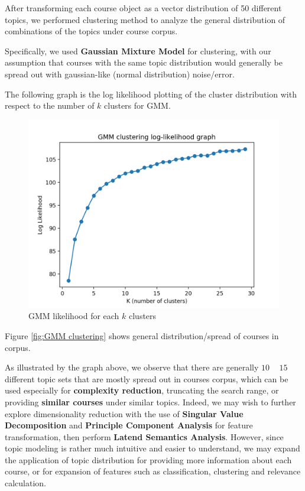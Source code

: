 \documentclass[twoside]{article}
\begin{document}
After transforming each course object as a vector distribution of 50 different topics, we performed clustering method to analyze the general distribution of combinations of the topics under course corpus.

Specifically, we used \textbf{Gaussian Mixture Model} for clustering, with our assumption that courses with the same topic distribution would generally be spread out with gaussian-like (normal distribution) noise/error.

The following graph is the log likelihood plotting of the cluster distribution with respect to the number of $k$ clusters for GMM.

\begin{figure}
  \includegraphics[width=\linewidth]{Images/10.png}
  \caption{GMM likelihood for each $k$ clusters}
  \label{fig:GMM_clustering}
\end{figure}
Figure \ref{fig:GMM clustering} shows general distribution/spread of courses in corpus.

As illustrated by the graph above, we observe that there are generally $10$ ~ $15$ different topic sets that are mostly spread out in courses corpus, which can be used especially for \textbf{complexity reduction}, truncating the search range, or providing \textbf{similar courses} under similar topics. Indeed, we may wish to further explore dimensionality reduction with the use of \textbf{Singular Value Decomposition} and \textbf{Principle Component Analysis} for feature transformation, then perform \textbf{Latend Semantics Analysis}. However, since topic modeling is rather much intuitive and easier to understand, we may expand the application of topic distribution for providing more information about each course, or for expansion of features such as classification, clustering and relevance calculation.
\end{document}
